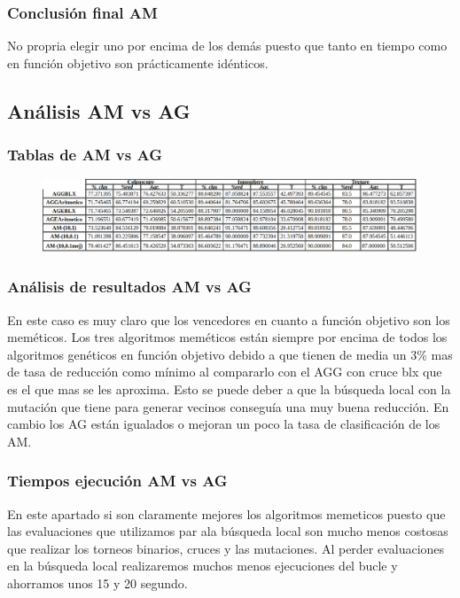 \documentclass[titlepage]{article}
\begin{document}
	\subsubsection{Conclusión final AM}
	No propria elegir uno por encima de los demás puesto que tanto en tiempo como en función objetivo son prácticamente idénticos.
	
	\subsection{Análisis AM vs AG}
	\subsubsection{Tablas de AM vs AG}
	\begin{figure}[H]
		\centering
		\includegraphics[width=1\linewidth]{screenshot010}
		\caption{}
		\label{fig:screenshot010}
	\end{figure}

	\subsubsection{Análisis de resultados AM vs AG}
	En este caso es muy claro que los vencedores en cuanto a función objetivo son los meméticos. Los tres algoritmos meméticos están siempre por encima de todos los algoritmos genéticos en función objetivo debido a que tienen de media un 3\% mas de tasa de reducción como mínimo al compararlo con el AGG con cruce blx que es el que mas se les aproxima. Esto se puede deber a que la búsqueda local con la mutación que tiene para generar vecinos conseguía una muy buena reducción. En cambio los AG están igualados o mejoran un poco la tasa de clasificación  de los AM. 
	
	\subsubsection{Tiempos ejecución AM vs AG}
	En este apartado si son claramente mejores los algoritmos memeticos puesto que las evaluaciones que utilizamos par ala búsqueda local son mucho menos costosas que realizar los torneos binarios, cruces y las mutaciones. Al perder evaluaciones en la búsqueda local realizaremos muchos menos ejecuciones del bucle y ahorramos unos 15 y 20 segundo. 
	
\end{document}
